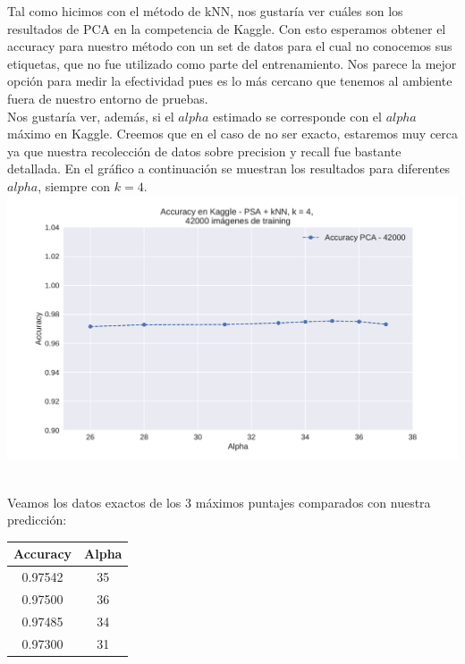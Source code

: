 Tal como hicimos con el método de kNN, nos gustaría ver cuáles son los resultados de PCA en la competencia de Kaggle. Con esto esperamos obtener el accuracy para nuestro método con un set de datos para el cual no conocemos sus etiquetas, que no fue utilizado como parte del entrenamiento. Nos parece la mejor opción para medir la efectividad pues es lo más cercano que tenemos al ambiente fuera de nuestro entorno de pruebas. \\

Nos gustaría ver, además, si el $alpha$ estimado se corresponde con el $alpha$ máximo en Kaggle. Creemos que en el caso de no ser exacto, estaremos muy cerca ya que nuestra recolección de datos sobre precision y recall fue bastante detallada. En el gráfico a continuación se muestran los resultados para diferentes $alpha$, siempre con $k=4$. \\

{\centering
    \includegraphics[scale=0.60]{informe/imagenes/pca/clasificacionKaggle.pdf} \\
}
$ $\newline

Veamos los datos exactos de los 3 máximos puntajes comparados con nuestra predicción: \\

\begin{center}
    \begin{tabular}{| c | c |}
    \hline
     Accuracy    & Alpha  \\ \hline
     0.97542  & 35  \\ \hline
     0.97500  & 36  \\ \hline
     0.97485  & 34  \\ \hline
     0.97300  & 31  \\ \hline
    \end{tabular}
\end{center}

